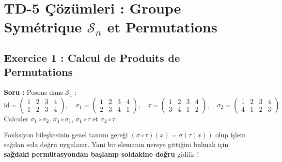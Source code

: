 \documentclass[12pt,a4paper]{report}
\begin{document}
\newpage
\section{TD-5 Çözümleri : Groupe Symétrique $\mathcal{S}_n$ et Permutations}

\subsection*{Exercice 1 : Calcul de Produits de Permutations}
\textbf{Soru :} Posons dans $\mathcal{S}_4$ :
\[
\mathrm{id} = \begin{pmatrix} 1 & 2 & 3 & 4 \\ 1 & 2 & 3 & 4 \end{pmatrix}, \quad 
\sigma_1 = \begin{pmatrix} 1 & 2 & 3 & 4 \\ 2 & 3 & 4 & 1 \end{pmatrix}, \quad 
\tau = \begin{pmatrix} 1 & 2 & 3 & 4 \\ 3 & 4 & 1 & 2 \end{pmatrix}, \quad 
\sigma_2 = \begin{pmatrix} 1 & 2 & 3 & 4 \\ 4 & 1 & 2 & 3 \end{pmatrix}
\]
Calculer $\sigma_1 \circ \sigma_2$, $\sigma_1 \circ \sigma_1$, $\sigma_1 \circ \tau$ et $\sigma_2 \circ \tau$.

\begin{tcolorbox}[colback=blue!5!white,colframe=blue!75!black,title=Hatırlatma: Permütasyon Bileşkesinde İşlem Sırası]
Fonksiyon bileşkesinin genel tanımı gereği $(\sigma \circ \tau)(x) = \sigma(\tau(x))$ olup işlem sağdan sola doğru uygulanır. Yani bir elemanın nereye gittiğini bulmak için \textbf{sağdaki permütasyondan başlanıp soldakine doğru} gidilir !
\end{tcolorbox}
\end{document}
